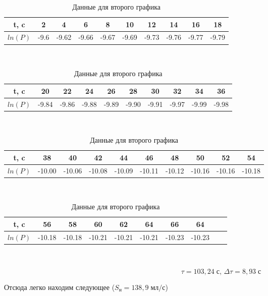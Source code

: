 \documentclass[a4paper, 12pt]{article} %
\begin{document}
\begin{table}[h]

		\begin{tabular}{| c | c | c | c | c | c | c | c | c | c |}
		\hline
		t, c    &  2   &  4    &  6    &  8    &  10   &  12   &  14   &  16   &  18   \\ \hline
		$ln(P)$ & -9.6 & -9.62 & -9.66 & -9.67 & -9.69 & -9.73 & -9.76 & -9.77 & -9.79 \\ \hline
		\end{tabular}\\
		
		\begin{tabular}{| c | c | c | c | c | c | c | c | c | c |}
		\hline
		t, c    & 20    & 22    & 24    & 26    & 28    & 30    & 32    & 34    & 36    \\ \hline
		$ln(P)$ & -9.84 & -9.86 & -9.88 & -9.89 & -9.90 & -9.91 & -9.97 & -9.99 & -9.98 \\ \hline
		\end{tabular}\\
		
		\begin{tabular}{| c | c | c | c | c | c | c | c | c | c |}
		\hline
t, c    & 38     & 40     & 42     & 44     & 46     & 48     & 50     & 52     & 54     \\ \hline
$ln(P)$ & -10.00 & -10.06 & -10.08 & -10.09 & -10.11 & -10.12 & -10.16 & -10.16 & -10.18 \\ \hline
		\end{tabular}\\
		
		\begin{tabular}{| c | c | c | c | c | c | c | c | c | c |}
		\hline
		t, c    & 56     & 58    & 60      & 62     & 64     & 66     & 64     \\ \hline
		$ln(P)$ & -10.18 & -10.18 & -10.21 & -10.21 & -10.21 & -10.23 & -10.23 \\ \hline
		\end{tabular}\\
				
	\caption{Данные для второго графика}	

\end{table}

\begin{equation}
	\tau = 103,24 \; \text{с, } \Delta \tau = 8,93 \; \text{с}
\end{equation}

Отсюда легко находим следующее ($S_{\text{н}} = 138,9 \; \text{мл/с}$)
\end{document}
